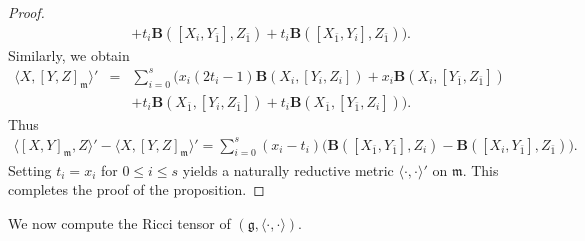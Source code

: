 \documentclass[reqno]{amsart}
\theoremstyle{definition}
\begin{document}
\begin{proof}
\begin{eqnarray*}
                                       &&+t_{i}\mathbf{B}([X_{i},Y_{\bar{1}}],Z_{\bar{1}})+t_{i}\mathbf{B}([X_{\bar{1}},Y_{i}],Z_{\bar{1}})
                                            \Big).
\end{eqnarray*}
Similarly, we obtain
\begin{eqnarray*}
\langle X, [Y,Z]_{\mathfrak{m}}\rangle'&=&\sum_{i=0}^{s}\Big(
                                          x_{i}(2t_{i}-1)\mathbf{B}(X_{i},[Y_{i},Z_{i}])+x_{i}\mathbf{B}(X_{i},[Y_{\bar{1}},Z_{\bar{1}}])\\
                                       && +t_{i}\mathbf{B}(X_{\bar{1}},[Y_{i},Z_{\bar{1}}])+t_{i}\mathbf{B}(X_{\bar{1}},[Y_{\bar{1}},Z_{i}])
                                          \Big).
\end{eqnarray*}
Thus
\begin{eqnarray*}
\langle [X,Y]_{\mathfrak{m}},Z\rangle'-\langle X, [Y,Z]_{\mathfrak{m}}\rangle'=
\sum_{i=0}^{s}(x_{i}-t_{i})\Big(
                                    \mathbf{B}([X_{\bar{1}},Y_{\bar{1}}],Z_{i})- \mathbf{B}([X_{i},Y_{\bar{1}}],Z_{\bar{1}})
                               \Big).
\end{eqnarray*}
Setting $t_{i}=x_{i}$ for $0\leq i\leq s$ yields a naturally reductive metric $\langle\cdot,\cdot\rangle'$ on $\mathfrak{m}$. This completes the proof of the proposition.
 \end{proof}

We now compute the Ricci tensor of $(\mathfrak{g},\langle\cdot,\cdot\rangle)$.
\end{document}
